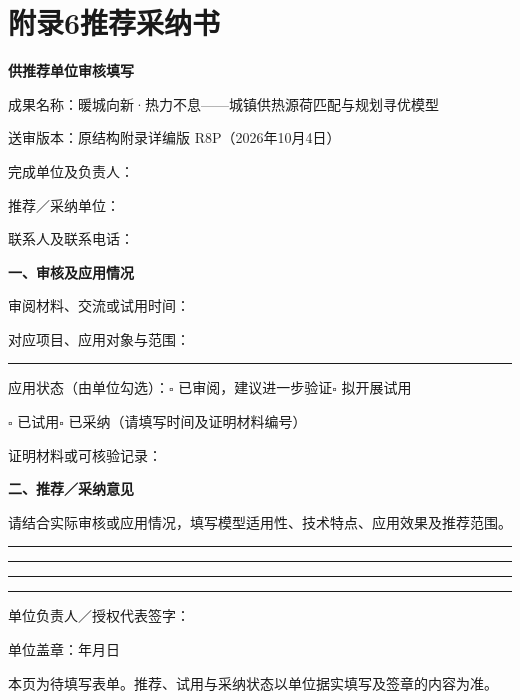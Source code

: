 \clearpage
\section*{附录6\quad 推荐采纳书}
{}
\begingroup
\fontsize{10.5pt}{13pt}\selectfont{}\setlength{\parskip}{5pt}
\begin{center}\textbf{供推荐单位审核填写}\end{center}
\noindent 成果名称：暖城向新·热力不息——城镇供热源荷匹配与规划寻优模型\par
\noindent 送审版本：原结构附录详编版 R8P（2026年10月4日）\par
\noindent 完成单位及负责人：\hrulefill\par
\noindent 推荐／采纳单位：\hrulefill\par
\noindent 联系人及联系电话：\hrulefill\par

\noindent\textbf{一、审核及应用情况}\par
\noindent 审阅材料、交流或试用时间：\hrulefill\par
\noindent 对应项目、应用对象与范围：\hrulefill\par
\noindent\rule{\linewidth}{0.3pt}\par
\noindent 应用状态（由单位勾选）：$\square$ 已审阅，建议进一步验证\quad $\square$ 拟开展试用\par
\noindent\hspace{2em}$\square$ 已试用\quad $\square$ 已采纳（请填写时间及证明材料编号）\par
\noindent 证明材料或可核验记录：\hrulefill\par

\noindent\textbf{二、推荐／采纳意见}\par
\noindent 请结合实际审核或应用情况，填写模型适用性、技术特点、应用效果及推荐范围。\par
\vspace{5pt}
\noindent\rule{\linewidth}{0.3pt}\par\vspace{5pt}
\noindent\rule{\linewidth}{0.3pt}\par\vspace{5pt}
\noindent\rule{\linewidth}{0.3pt}\par\vspace{5pt}
\noindent\rule{\linewidth}{0.3pt}\par
\vspace{8pt}
\noindent 单位负责人／授权代表签字：\hrulefill\par
\noindent 单位盖章：\hfill 年\hspace{1.5em}月\hspace{1.5em}日\par
\vspace{5pt}
{\wuhao 本页为待填写表单。推荐、试用与采纳状态以单位据实填写及签章的内容为准。}

\endgroup
